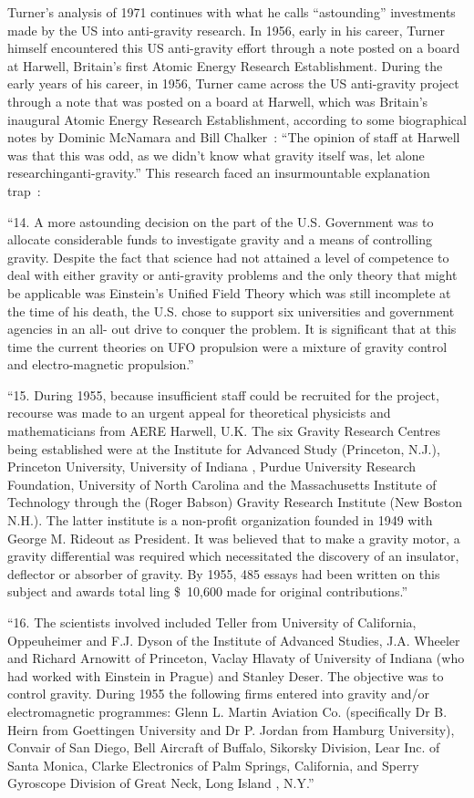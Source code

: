 Turner's analysis of 1971 continues with what he calls ``astounding'' investments made by the US into anti-gravity research.
In 1956, early in his career, Turner  himself encountered this US anti-gravity effort through a note posted on a board at Harwell,
Britain's first Atomic Energy Research Establishment.
During the early years of his career, in 1956, Turner came across the US anti-gravity project through a note that was posted on a board at Harwell,
which was Britain's inaugural Atomic Energy Research Establishment, according to some biographical notes by   Dominic McNamara and Bill Chalker~\cite{Turner-bio-Chalker}:
``The opinion of staff at Harwell was that this was odd, as we didn't know what gravity itself was, let alone researchinganti-gravity.''
This research faced an insurmountable explanation trap~\cite{TurnerAustralia1971}:
\begin{svgraybox}
``14. A more astounding decision on the part of the U.S. Government
was to allocate considerable funds to investigate gravity and a
means of controlling gravity. Despite the fact that science had
not attained a level of competence to deal with either gravity or
anti-gravity problems and the only theory that might be applicable
was Einstein's Unified Field Theory which was still incomplete at the
time of his death, the U.S. chose to support six universities and
government agencies in an all- out drive to conquer the problem.
It is significant that at this time the current theories on UFO
propulsion were a mixture of gravity control and electro-magnetic
propulsion.''

``15. During 1955, because insufficient staff could be recruited
for the project, recourse was made to an urgent appeal for theoretical
physicists and mathematicians from AERE Harwell, U.K. The six
Gravity Research Centres being established were at the Institute for
Advanced Study (Princeton, N.J.), Princeton University, University
of Indiana , Purdue University Research Foundation, University of
North Carolina and the Massachusetts Institute of Technology
through the (Roger Babson) Gravity Research Institute (New Boston
N.H.). The latter institute is a non-profit organization founded
in 1949 with George M. Rideout as President. It was believed that
to make a gravity motor, a gravity differential was required which
necessitated the discovery of an insulator, deflector or absorber
of gravity. By 1955, 485 essays had been written on this subject
and awards total ling {\$}~10,600 made for original contributions.''

``16. The scientists involved included Teller from University
of California, Oppeuheimer and F.J. Dyson of the Institute of
Advanced Studies, J.A. Wheeler and Richard Arnowitt of Princeton,
Vaclay Hlavaty of University of Indiana (who had worked with
Einstein in Prague) and Stanley Deser. The objective was to control
gravity. During 1955 the following firms entered into gravity
and/or electromagnetic programmes: Glenn L. Martin Aviation Co.
(specifically Dr B. Heirn from Goettingen University and Dr P.
Jordan from Hamburg University), Convair of San Diego, Bell Aircraft
of Buffalo, Sikorsky Division, Lear Inc. of Santa Monica, Clarke
Electronics of Palm Springs, California, and Sperry Gyroscope
Division of Great Neck, Long Island , N.Y.''


\end{svgraybox}
